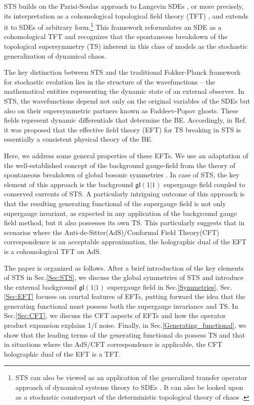 \documentclass[final,5p,10pt,times,twocolumn,year]{elsarticle}
\begin{document}
STS builds on the Parisi-Soulas approach to Langevin SDEs \cite{ParSour,ParSour1,ZinnJustin}, or more precisely, its interpretation \cite{Baulieu_1988} as a cohomological topological field theory (TFT) \cite{TFT_BOOK,labastida1989,Baulieu_1988,Baulieu_1989,Witten_1982,Witten98,Witten981}, and extends it to SDEs of arbitrary form.\footnote{STS can also be viewed as an application of the generalized transfer operator approach of dynamical systems theory to SDEs \cite{Rue02}. It can also be looked upon as a stochastic counterpart of the deterministic topological theory of chaos \cite{Gilmore_book}.} This framework reformulates an SDE as a cohomological TFT and recognizes that the spontaneous breakdown of the topological supersymmetry (TS) inherent in this class of models as the stochastic generalization of dynamical chaos.

The key distinction between STS and the traditional Fokker-Planck framework for stochastic evolution lies in the structure of the wavefunctions -- the mathematical entities representing the dynamic state of an external observer. In STS, the  wavefunctions depend not only on the original variables of the SDEs but also on their supersymmetric partners known as Faddeev-Popov ghosts. These fields represent dynamic differentials that determine the BE. Accordingly, in Ref. \cite{OVCHINNIKOV2024114611} it was proposed that the effective field theory (EFT) for TS breaking in STS is essentially a consistent physical theory of the BE. 

Here, we address some general properties of these EFTs. We use an adaptation of the well-established concept of the background gauge-field from the theory of spontaneous breakdown of global bosonic symmetries \cite{RFT_SSB_book}. In case of STS, the key element of this approach is the background $\mathfrak{gl}(1|1)$ supergauge field coupled to conserved currents of STS. A particularly intriguing outcome of this approach is that the resulting generating functional of the supergauge field is not only supergauge invariant, as expected in any application of the background gauge field method, but it also possesses its own TS. This particularly suggests that in scenarios where the Anti-de-Sitter(AdS)/Conformal Field Theory(CFT) correspondence \cite{AdSCFT_Maldacena,GUBSER1998105,Witten1998AntideSS,natsuume2016adscftdualityuserguide,Penedones_2016,KaplanAdSCFT} is an acceptable approximation, the holographic dual of the EFT is a cohomological TFT on AdS.

The paper is organized as follows. After a brief introduction of the key elements of STS in Sec.\ref{Sec:STS}, we discuss the global symmetries of STS and introduce the external background $\mathfrak{gl}(1|1)$ supergauge field in Sec.\ref{Symmetries}. Sec.\ref{Sec:EFT} focuses on cenrtal features of EFTs, putting forward the idea that the generating functional must possess both the supergauge invariance and TS. In Sec.\ref{Sec:CFT}, we discuss the CFT aspects of EFTs and how the operator product expansion explains 1/f noise. Finally, in Sec.\ref{Generating_functional}, we show that the leading terms of the generating functional do possess TS and that in situations where the AdS/CFT correspondence is applicable, the CFT holographic dual of the EFT is a TFT.
\end{document}
